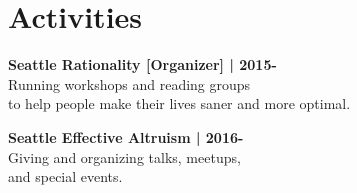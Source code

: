 \sectionsep
\section{Activities}

\textbf{Seattle Rationality [Organizer] | 2015-}\\
Running workshops and reading groups \\ to help people make their lives saner and more optimal.
\sectionsep

\textbf{Seattle Effective Altruism | 2016-}\\
Giving and organizing talks, meetups, \\ and special events.
\sectionsep
